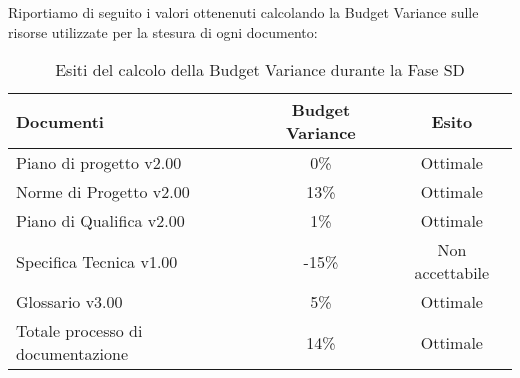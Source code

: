 			Riportiamo di seguito i valori ottenenuti calcolando la Budget Variance sulle risorse utilizzate per la stesura di ogni documento:
			\begin{table}[H]
					\centering
					\begin{tabu}{| l | c | c |}
							\hline
							Documenti 							& Budget Variance	& Esito		\\ \hline \hline
							
							Piano di progetto v2.00				& 0\% 		& Ottimale  \\ \hline
							Norme di Progetto v2.00 			& 13\%		& Ottimale  \\ \hline
							Piano di Qualifica v2.00 			& 1\%		& Ottimale  \\ \hline
							Specifica Tecnica v1.00 			& -15\%		& Non accettabile  \\ \hline
							Glossario v3.00					 	& 5\% 		& Ottimale  \\ \hline
							Totale processo di documentazione & 14\% & Ottimale \\ \hline
						\end{tabu}
					\caption{Esiti del calcolo della Budget Variance durante la Fase SD}
				\end{table}

